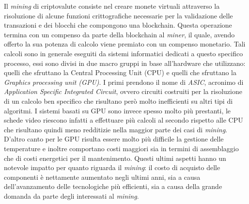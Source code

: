 \documentclass[conference, italian]{IEEEtran}
\begin{document}
Il \emph{mining} di criptovalute consiste nel creare monete virtuali attraverso la risoluzione di alcune funzioni crittografiche necessarie per la validazione delle transazioni e dei blocchi che compongono una blockchain. Questa operazione termina con un compenso da parte della blockchain al \emph{miner}, il quale, avendo offerto la sua potenza di calcolo viene premiato con un compenso monetario. Tali calcoli sono in generale eseguiti da sistemi informatici dedicati a questo specifico processo, essi sono divisi in due macro gruppi in base all'hardware che utilizzano: quelli che sfruttano la Central Processing Unit (CPU) e quelli che sfruttano la \emph{Graphics processing unit (GPU)}. I primi prendono il nome di \emph{ASIC}, acronimo di \emph{Application Specific Integrated Circuit}, ovvero circuiti costruiti per la risoluzione di un calcolo ben specifico che risultano però molto inefficienti su altri tipi di algoritmi. I sistemi basati su GPU sono invece spesso molto più prestanti, le schede video riescono infatti a effettuare più calcoli al secondo rispetto alle CPU che risultano quindi meno redditizie nella maggior parte dei casi di \emph{mining}. D'altro canto per le GPU risulta essere molto più difficile la gestione delle temperature e inoltre comportano costi maggiori sia in termini di assemblaggio che di costi energetici per il mantenimento. Questi ultimi aspetti hanno un notevole impatto per quanto riguarda il \emph{mining}: il costo di acquisto delle componenti è nettamente aumentato negli ultimi anni, sia a causa dell'avanzamento delle tecnologiche più efficienti, sia a causa della grande domanda da parte degli interessati al \emph{mining}.\\
\end{document}
